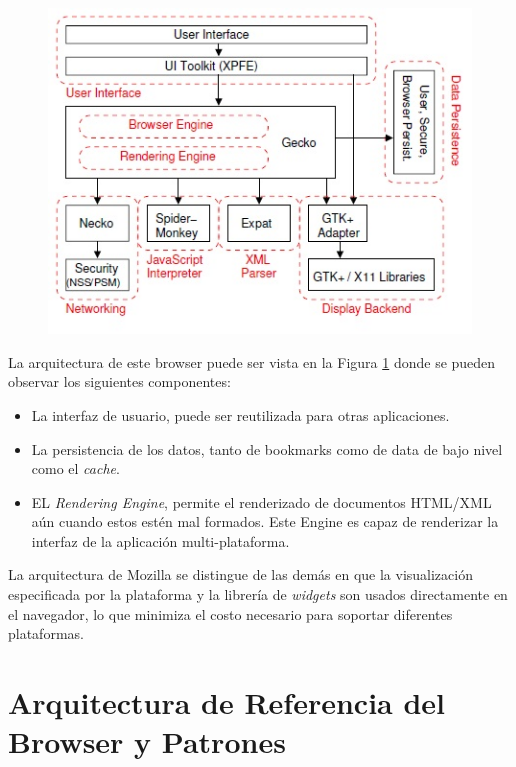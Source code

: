     \begin{figure}[h!t]
        \begin{center}
    		\includegraphics[scale=0.8]{figures/archMoz.jpg}
          \label{fig:archM}
        \end{center}
    \end{figure}
            
    La arquitectura de este browser puede ser vista en la Figura \ref{fig:archM} donde se pueden observar los siguientes componentes:
            \begin{itemize}
                \item La interfaz de usuario, puede ser reutilizada para otras aplicaciones.
                \item La persistencia de los datos, tanto de bookmarks como de data de bajo nivel como el \textit{cache}.
                \item EL \textit{Rendering Engine}, permite el renderizado de documentos HTML/XML aún cuando estos estén mal formados. Este Engine es capaz de renderizar la interfaz de la aplicación multi-plataforma.
            \end{itemize}
    La arquitectura de Mozilla se distingue de las demás en que la visualización especificada por la plataforma y la librería de \textit{widgets} son usados directamente en el navegador, lo que minimiza el costo necesario para soportar diferentes plataformas.
            



\section{Arquitectura de Referencia del Browser y Patrones}
\label{chap3:ArqRefBrowandPatt}

